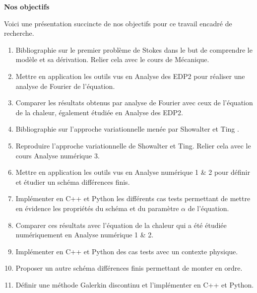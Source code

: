 
\thispagestyle{empty}
\vspace*{1cm}

\begin{center}
    \Large\textbf{Nos objectifs}
\end{center}

Voici une présentation succincte de nos objectifs pour ce travail encadré de recherche.

\begin{enumerate}
    \item Bibliographie sur le premier problème de Stokes \cite{Christov2010} dans le but de comprendre le modèle et sa dérivation. Relier cela avec le cours de Mécanique.
    \item Mettre en application les outils vus en Analyse des EDP2 pour réaliser une analyse de Fourier de l'équation.
    \item Comparer les résultats obtenus par analyse de Fourier avec ceux de l'équation de la chaleur, également étudiée en Analyse des EDP2.
    \item Bibliographie sur l'approche variationnelle menée par Showalter et Ting \cite{Showalter_Ting}.
    \item Reproduire l'approche variationnelle de Showalter et Ting. Relier cela avec le cours Analyse numérique 3.
    \item Mettre en application les outils vus en Analyse numérique 1 \& 2 pour définir et étudier un schéma différences finis.
    \item Implémenter en C++ et Python les différents cas tests permettant de mettre en évidence les propriétés du schéma et du paramètre $\alpha$ de l'équation.
    \item Comparer ces résultats avec l'équation de la chaleur qui a été étudiée numériquement en Analyse numérique 1 \& 2.
    \item Implémenter en C++ et Python des cas tests avec un contexte physique.
    \item Proposer un autre schéma différences finis permettant de monter en ordre.
    \item Définir une méthode Galerkin discontinu et l'implémenter en C++ et Python.
\end{enumerate}